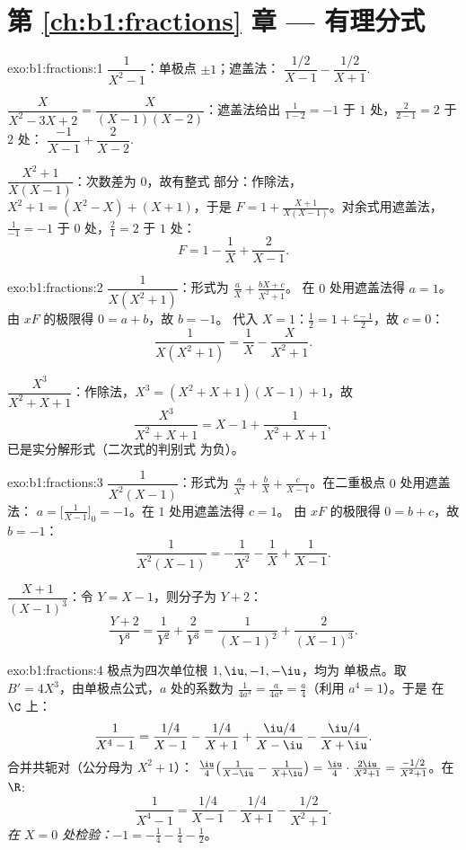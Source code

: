 \section*{第 \ref{ch:b1:fractions} 章 --- 有理分式}

\begin{solution}{exo:b1:fractions:1}
$\dfrac{1}{X^2 - 1}$：单极点 $\pm 1$；遮盖法：
$\dfrac{1/2}{X-1} - \dfrac{1/2}{X+1}$.

$\dfrac{X}{X^2 - 3X + 2} = \dfrac{X}{(X-1)(X-2)}$：遮盖法给出
$\frac{1}{1-2} = -1$ 于 $1$ 处，$\frac{2}{2-1} = 2$ 于 $2$ 处：
$\dfrac{-1}{X-1} + \dfrac{2}{X-2}$.

$\dfrac{X^2+1}{X(X-1)}$：次数差为 $0$，故有整式
部分：作除法，$X^2 + 1 = (X^2 - X) + (X + 1)$，于是 $F = 1 +
\frac{X+1}{X(X-1)}$。对余式用遮盖法，$\frac{1}{-1} = -1$
于 $0$ 处，$\frac{2}{1} = 2$ 于 $1$ 处：
\[
F = 1 - \frac{1}{X} + \frac{2}{X-1} .
\]
\end{solution}

\begin{solution}{exo:b1:fractions:2}
$\dfrac{1}{X(X^2+1)}$：形式为 $\frac aX + \frac{bX + c}{X^2 + 1}$。
在 $0$ 处用遮盖法得 $a = 1$。由 $xF$ 的极限得 $0 = a + b$，故 $b = -1$。
代入 $X = 1$：$\frac12 = 1 + \frac{c - 1}{2}$，故 $c = 0$：
\[
\frac{1}{X(X^2+1)} = \frac 1X - \frac{X}{X^2+1} .
\]

$\dfrac{X^3}{X^2+X+1}$：作除法，$X^3 = (X^2+X+1)(X - 1) + 1$，故
\[
\frac{X^3}{X^2+X+1} = X - 1 + \frac{1}{X^2 + X + 1} ,
\]
已是实分解形式（二次式的判别式
为负）。
\end{solution}

\begin{solution}{exo:b1:fractions:3}
$\dfrac{1}{X^2(X-1)}$：形式为 $\frac{a}{X^2} + \frac bX +
\frac{c}{X-1}$。在二重极点 $0$ 处用遮盖法：
$a = \bigl[\frac{1}{X-1}\bigr]_{0} = -1$。在 $1$ 处用遮盖法得 $c = 1$。
由 $xF$ 的极限得 $0 = b + c$，故 $b = -1$：
\[
\frac{1}{X^2(X-1)} = -\frac{1}{X^2} - \frac1X + \frac{1}{X-1} .
\]

$\dfrac{X+1}{(X-1)^3}$：令 $Y = X - 1$，则分子为 $Y + 2$：
\[
\frac{Y + 2}{Y^3} = \frac{1}{Y^2} + \frac{2}{Y^3}
= \frac{1}{(X-1)^2} + \frac{2}{(X-1)^3} .
\]
\end{solution}

\begin{solution}{exo:b1:fractions:4}
极点为四次单位根 $1, \iu, -1, -\iu$，均为
单极点。取 $B' = 4X^3$，由单极点公式，$a$ 处的系数为
$\frac{1}{4a^3} = \frac{a}{4a^4} = \frac a4$（利用 $a^4 = 1$）。于是
在 $\C$ 上：
\[
\frac{1}{X^4 - 1}
= \frac{1/4}{X - 1} - \frac{1/4}{X + 1}
+ \frac{\iu/4}{X - \iu} - \frac{\iu/4}{X + \iu} .
\]
合并共轭对（公分母为 $X^2 + 1$）：
$\frac{\iu}{4}\bigl(\frac{1}{X-\iu} - \frac{1}{X+\iu}\bigr) =
\frac{\iu}{4}\cdot\frac{2\iu}{X^2+1} = \frac{-1/2}{X^2+1}$。在
$\R$:
\[
\frac{1}{X^4 - 1}
= \frac{1/4}{X-1} - \frac{1/4}{X+1} - \frac{1/2}{X^2 + 1} .
\]
\emph{在 $X = 0$ 处检验：}$-1 = -\frac14 - \frac14 - \frac12$。
\end{solution}

